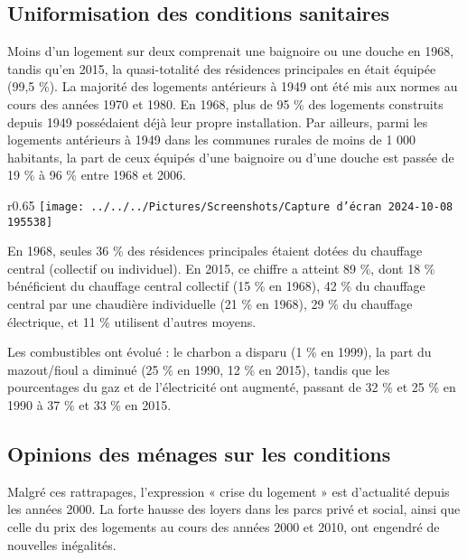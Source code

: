 \documentclass[a4paper, 12pt]{report}
\begin{document}
\subsection{Uniformisation des conditions sanitaires}

Moins d'un logement sur deux comprenait une baignoire ou une douche en 1968, tandis qu'en 2015, la quasi-totalité des résidences principales en était équipée (99,5 \%). La majorité des logements antérieurs à 1949 ont été mis aux normes au cours des années 1970 et 1980. En 1968, plus de 95 \% des logements construits depuis 1949 possédaient déjà leur propre installation. Par ailleurs, parmi les logements antérieurs à 1949 dans les communes rurales de moins de 1 000 habitants, la part de ceux équipés d'une baignoire ou d'une douche est passée de 19 \% à 96 \% entre 1968 et 2006.
\begin{wrapfigure}{r}{0.65\textwidth}
	\centering
\texttt{[image: ../../../Pictures/Screenshots/Capture d'écran 2024-10-08 195538]}
\end{wrapfigure}

En 1968, seules 36 \% des résidences principales étaient dotées du chauffage central (collectif ou individuel). En 2015, ce chiffre a atteint 89 \%, dont 18 \% bénéficient du chauffage central collectif (15 \% en 1968), 42 \% du chauffage central par une chaudière individuelle (21 \% en 1968), 29 \% du chauffage électrique, et 11 \% utilisent d'autres moyens. 

Les combustibles ont évolué : le charbon a disparu (1 \% en 1999), la part du mazout/fioul a diminué (25 \% en 1990, 12 \% en 2015), tandis que les pourcentages du gaz et de l'électricité ont augmenté, passant de 32 \% et 25 \% en 1990 à 37 \% et 33 \% en 2015.

\subsection{Opinions des ménages sur les conditions}

Malgré ces rattrapages, l'expression « crise du logement » est d'actualité depuis les années 2000. La forte hausse des loyers dans les parcs privé et social, ainsi que celle du prix des logements au cours des années 2000 et 2010, ont engendré de nouvelles inégalités. 
\end{document}
